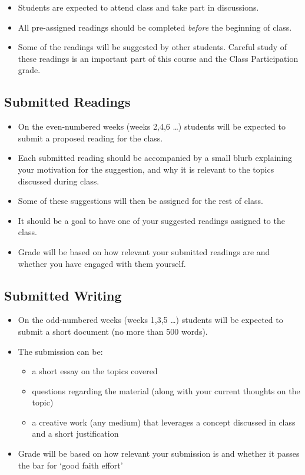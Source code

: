 \documentclass{article}
\begin{document}
\begin{itemize}
  \item Students are expected to attend class and take part in discussions.
  \item All pre-assigned readings should be completed \emph{before} the beginning of class.
  \item Some of the readings will be suggested by other students. Careful study of these readings is an important part of this course and the Class Participation grade.
\end{itemize}

\subsection*{Submitted Readings}

\begin{itemize}
  \item On the even-numbered weeks (weeks 2,4,6 \dots) students will be expected to submit a proposed reading for the class.
  \item Each submitted reading should be accompanied by a small blurb explaining your motivation for the suggestion, and why it is relevant to the topics discussed during class.
  \item Some of these suggestions will then be assigned for the rest of class.
  \item It should be a goal to have one of your suggested readings assigned to the class.
  \item Grade will be based on how relevant your submitted readings are and whether you have engaged with them yourself.
\end{itemize}

\subsection*{Submitted Writing}

\begin{itemize}
  \item On the odd-numbered weeks (weeks 1,3,5 \dots) students will be expected to submit a short document (no more than 500 words).
  \item The submission can be:
    \begin{itemize}
      \item a short essay on the topics covered
      \item questions regarding the material (along with your current thoughts on the topic)
      \item a creative work (any medium) that leverages a concept discussed in class and a short justification
    \end{itemize}
  \item Grade will be based on how relevant your submission is and whether it passes the bar for `good faith effort'
\end{itemize}
\end{document}
